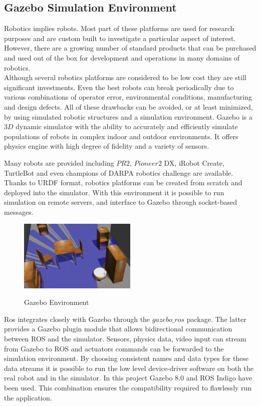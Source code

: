 \subsection{Gazebo Simulation Environment}

Robotics implies robots. Most part of these platforms are used for research purposes and are custom built to investigate a particular aspect of interest. However, there are a growing number of standard products that can be purchased and used out of the box for development and operations in many domains of robotics.\\
Although several robotics platforms are considered to be low cost they are still significant investments. Even the best robots can break periodically due to various combinations of operator error, environmental conditions, manufacturing and design defects. All of these drawbacks can be avoided, or at least minimized, by using simulated robotic structures and a simulation environment. Gazebo is a $3D$ dynamic simulator with the ability to accurately and efficiently simulate populations of robots in complex indoor and outdoor environments. It offers physics engine with high degree of fidelity and a variety of sensors.

Many robots are provided including $PR2$, $Pioneer2$ DX, iRobot Create, TurtleBot and even champions of DARPA robotics challenge are available. Thanks to URDF format, robotics platforms can be created from scratch and deployed into the simulator.
With this environment it is possible to run simulation on remote servers, and interface to Gazebo through socket-based messages.

\begin{figure}[H]
\centering
\includegraphics[width=0.5\textwidth]{imgs/gazebo2.png}
\label{fig:gazebo2}
\caption{Gazebo Environment}
\end{figure}

Ros integrates closely with Gazebo through the $gazebo\_ros$ package. The latter provides a Gazebo plugin module that allows bidirectional communication between ROS and the simulator. Sensors, physics data, video input can stream from Gazebo to ROS and actuators commands can be forwarded to the simulation environment. By choosing consistent names and data types for these data streams it is possible to run the low level device-driver software on both the real robot and in the simulator. In this project Gazebo 8.0 and ROS Indigo have been used. This combination ensures the compatibility required to flawlessly run the application.